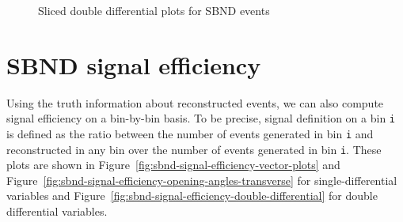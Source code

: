 \documentclass{article}
\begin{document}
\begin{figure}
    \caption{Sliced double differential plots for SBND events}
    \label{fig:sbnd-double-diff-sliced}
\end{figure}

\section{SBND signal efficiency}

Using the truth information about reconstructed events, we can also compute signal efficiency on a bin-by-bin basis. To be precise, signal definition on a bin \verb|i| is defined as the ratio between the number of events generated in bin \verb|i| and reconstructed in any bin over the number of events generated in bin \verb|i|. These plots are shown in Figure~\ref{fig:sbnd-signal-efficiency-vector-plots} and Figure~\ref{fig:sbnd-signal-efficiency-opening-angles-transverse} for single-differential variables and Figure~\ref{fig:sbnd-signal-efficiency-double-differential} for double differential variables.
\end{document}
